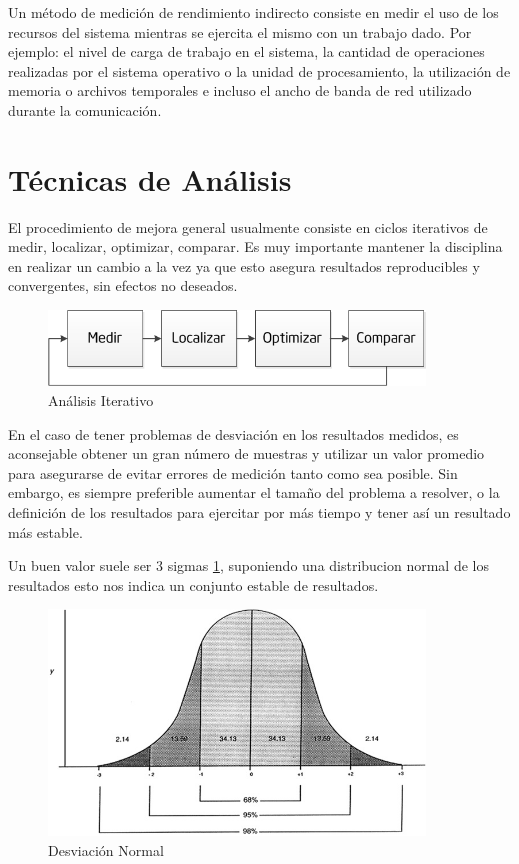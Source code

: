 \documentclass[a4paper]{report}
\begin{document}
Un m\'etodo de medici\'on de rendimiento indirecto consiste en medir el uso de
los recursos del sistema mientras se ejercita el mismo con un trabajo dado.
Por ejemplo: el nivel de carga de trabajo en el sistema, la cantidad de operaciones realizadas por el
sistema operativo o la unidad de procesamiento, la utilizaci\'on de memoria o
archivos temporales e incluso el ancho de banda de red utilizado durante la comunicaci\'on.

\section{T\'ecnicas de An\'alisis}

El procedimiento de mejora general usualmente consiste en ciclos iterativos de medir, localizar, optimizar,
comparar. Es muy importante mantener la disciplina en realizar un cambio a la
vez ya que esto asegura resultados reproducibles y convergentes, sin efectos no deseados.

\bigskip

\begin{figure}[H]
\begin{center}
\includegraphics[width=10cm]{cycle.png}
\caption{An\'alisis Iterativo}
\end{center}
\end{figure}

\bigskip

En el caso de tener problemas de desviaci\'on en los resultados medidos, es aconsejable obtener un gran n\'umero de muestras y utilizar
un valor promedio para asegurarse de evitar errores de medici\'on tanto como sea posible. Sin embargo, es siempre preferible aumentar el tama\~no
del problema a resolver, o la definici\'on de los resultados para ejercitar por m\'as tiempo y tener as\'i un resultado m\'as estable.

Un buen valor suele ser 3 sigmas \ref{fig:deviation}, suponiendo una distribucion normal de los resultados
esto nos indica un conjunto estable de resultados.

\begin{figure}[H]
\label{fig:deviation}
\begin{center}
\includegraphics[width=10cm]{deviation.png}
\caption{Desviaci\'on Normal}
\end{center}
\end{figure}
\end{document}
